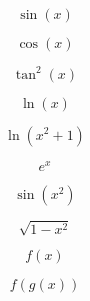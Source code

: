 \documentclass{article}
\begin{document}
\[
\sin(x)
\]

\[
\cos(x)
\]

\[
\tan^2(x)
\]

\[
\ln(x)
\]

\[
\ln(x^2+1)
\]

\[
e^x
\]

\[
\sin(x^2)
\]

\[
\sqrt{1-x^2}
\]

\[
f(x)
\]

\[
f(g(x))
\]
\end{document}
